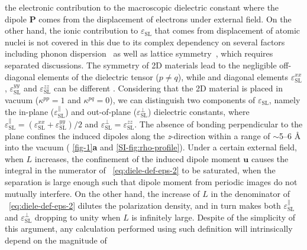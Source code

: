 the electronic contribution to the macroscopic dielectric constant
where the dipole $\boldsymbol{P}$ comes from the displacement of
electrons under external field.  On the other hand, the ionic
contribution to $\varepsilon_{\mathrm{SL}}$ that comes from
displacement of atomic nuclei is not covered in this due to its
complex dependency on several factors including phonon
dispersion~\cite{Sohier_2017_phonon} as well as lattice
symmetry~\cite{Laturia_2018_2D_eps}, which requires separated discussions.
The symmetry of 2D materials lead to the negligible off-diagonal
elements of the dielectric tensor ($p \neq q$), while and diagonal
elements $\varepsilon_{\mathrm{SL}}^{xx}$,
$\varepsilon_{\mathrm{SL}}^{yy}$ and $\varepsilon_{\mathrm{SL}}^{zz}$
can be different \cite{Sohier_2016}.  Considering that the 2D material
is placed in vacuum ($\kappa^{pp} = 1$ and $\kappa^{pq} = 0$), we can
distinguish two components of $\varepsilon_{\mathrm{SL}}$, namely the
in-plane ($\varepsilon_{\mathrm{SL}}^{\parallel}$) and out-of-plane
($\varepsilon_{\mathrm{SL}}^{\perp}$) dielectric constants, where
$\varepsilon_{\mathrm{SL}}^{\parallel} =
(\varepsilon_{\mathrm{SL}}^{xx} + \varepsilon_{\mathrm{SL}}^{yy})/2$
and
$\varepsilon_{\mathrm{SL}}^{\perp} = \varepsilon_{\mathrm{SL}}^{zz}$.
The absence of bonding perpendicular to the plane confines the induced
dipoles along the \textit{z}-direction within a range of $\sim{}$5--6
\AA{} into the vacuum ( \autoref{fig-1}{\textbf a} and 
 \autoref{SI-fig:rho-profile}).
%
%
Under a certain external field, when $L$ increases, the confinement of
the induced dipole moment $\boldsymbol{u}$ causes the integral in the
numerator of ~\autoref{eq:diele-def-eps-2} to be saturated, when the
separation is large enough such that dipole moment from periodic
images do not mutually interfere. On the other hand, the increase of
$L$ in the denominator of ~\autoref{eq:diele-def-eps-2} dilutes the polarization density, and in turn makes both
$\varepsilon^{\parallel}_{\mathrm{SL}}$ and
$\varepsilon^{\perp}_{\mathrm{SL}}$ dropping to
unity when $L$ is infinitely large.
%
%
%
Despite of the simplicity of this argument, any calculation performed
using such definition will intrinsically depend on the magnitude of
